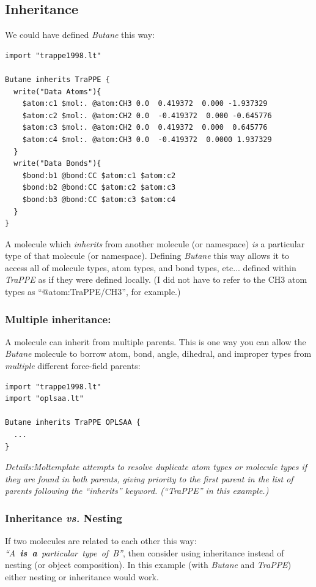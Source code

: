 \documentclass[11pt]{article}
\begin{document}
\subsection{Inheritance}
\label{sec:inheritance}
We could have defined \textit{Butane} this way:
\begin{verbatim}
import "trappe1998.lt"

Butane inherits TraPPE {
  write("Data Atoms"){
    $atom:c1 $mol:. @atom:CH3 0.0  0.419372  0.000 -1.937329
    $atom:c2 $mol:. @atom:CH2 0.0  -0.419372  0.000 -0.645776
    $atom:c3 $mol:. @atom:CH2 0.0  0.419372  0.000  0.645776
    $atom:c4 $mol:. @atom:CH3 0.0  -0.419372  0.0000 1.937329
  }
  write("Data Bonds"){
    $bond:b1 @bond:CC $atom:c1 $atom:c2
    $bond:b2 @bond:CC $atom:c2 $atom:c3
    $bond:b3 @bond:CC $atom:c3 $atom:c4
  }
}
\end{verbatim}
A molecule which \textit{inherits} from another molecule (or namespace)
\textit{is} a particular type of that molecule (or namespace).
Defining \textit{Butane} this way allows it to 
access all of molecule types, atom types, and bond types, etc...
defined within \textit{TraPPE} as if they were defined locally.
(I did not have to refer to the CH3 atom types as ``@atom:TraPPE/CH3'',
 for example.)

\subsubsection{Multiple inheritance:}
\label{sec:multiple_inheritance}
A molecule can inherit from multiple parents.
This is one way you can allow the \textit{Butane} molecule
to borrow atom, bond, angle, dihedral, and improper types from
\textit{multiple} different force-field parents:
\begin{verbatim}
import "trappe1998.lt"
import "oplsaa.lt"

Butane inherits TraPPE OPLSAA {
  ...
}
\end{verbatim}
\textit{Details:Moltemplate attempts to resolve duplicate atom types or 
molecule types if they are found in both parents, giving priority to the 
first parent in the list of parents following the ``inherits'' keyword. 
(``TraPPE'' in this example.)
}

\subsubsection{Inheritance \textit{vs.} Nesting}
\label{sec:inheritance_vs_nesting}
If two molecules are related to each other this way:
\mbox{\textit{``A \textbf{is a} particular type of B''}},
then consider using inheritance instead of nesting
(or object composition).
In this example (with \textit{Butane} and \textit{TraPPE})
either nesting or inheritance would work.
\end{document}
